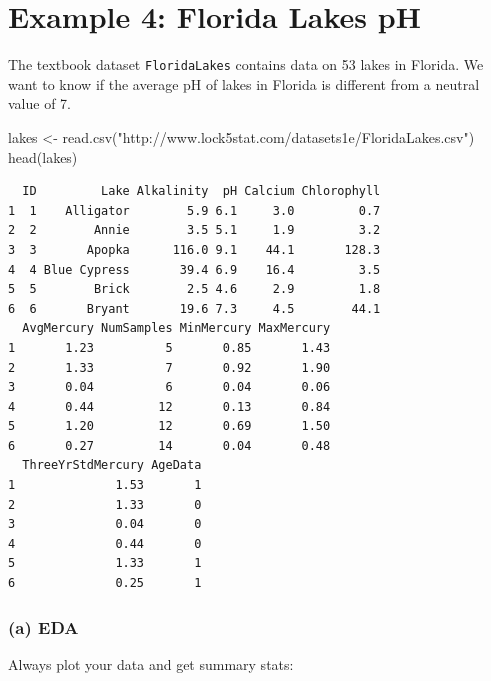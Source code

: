 \documentclass[
]{book}
\newenvironment{Shaded}{\begin{snugshade}}{\end{snugshade}}
\newcommand{\FunctionTok}[1]{\textcolor[rgb]{0.00,0.00,0.00}{#1}}
\newcommand{\NormalTok}[1]{#1}
\newcommand{\OtherTok}[1]{\textcolor[rgb]{0.56,0.35,0.01}{#1}}
\newcommand{\SpecialCharTok}[1]{\textcolor[rgb]{0.00,0.00,0.00}{#1}}
\newcommand{\StringTok}[1]{\textcolor[rgb]{0.31,0.60,0.02}{#1}}
\begin{document}
\hypertarget{example-4-florida-lakes-ph}{%
\section{Example 4: Florida Lakes pH}\label{example-4-florida-lakes-ph}}

The textbook dataset \texttt{FloridaLakes} contains data on 53 lakes in Florida. We want to know if the average pH of lakes in Florida is different from a neutral value of 7.

\begin{Shaded}
\begin{Highlighting}[]
\NormalTok{lakes }\OtherTok{\textless{}{-}} \FunctionTok{read.csv}\NormalTok{(}\StringTok{"http://www.lock5stat.com/datasets1e/FloridaLakes.csv"}\NormalTok{)}
\FunctionTok{head}\NormalTok{(lakes)}
\end{Highlighting}
\end{Shaded}

\begin{verbatim}
  ID         Lake Alkalinity  pH Calcium Chlorophyll
1  1    Alligator        5.9 6.1     3.0         0.7
2  2        Annie        3.5 5.1     1.9         3.2
3  3       Apopka      116.0 9.1    44.1       128.3
4  4 Blue Cypress       39.4 6.9    16.4         3.5
5  5        Brick        2.5 4.6     2.9         1.8
6  6       Bryant       19.6 7.3     4.5        44.1
  AvgMercury NumSamples MinMercury MaxMercury
1       1.23          5       0.85       1.43
2       1.33          7       0.92       1.90
3       0.04          6       0.04       0.06
4       0.44         12       0.13       0.84
5       1.20         12       0.69       1.50
6       0.27         14       0.04       0.48
  ThreeYrStdMercury AgeData
1              1.53       1
2              1.33       0
3              0.04       0
4              0.44       0
5              1.33       1
6              0.25       1
\end{verbatim}

\hypertarget{a-eda}{%
\subsubsection{(a) EDA}\label{a-eda}}

Always plot your data and get summary stats:

\begin{Shaded}
\end{Shaded}
\end{document}

